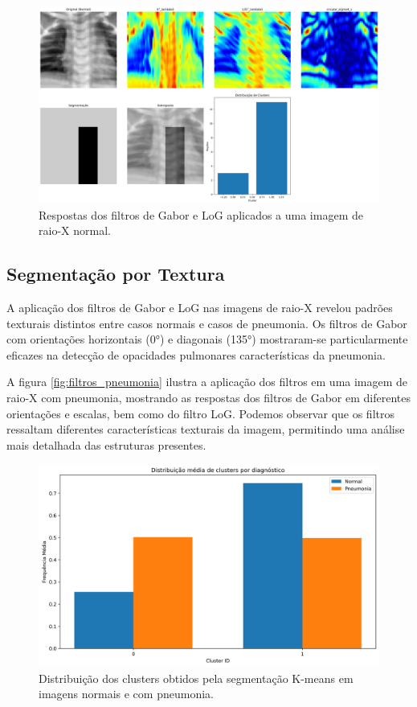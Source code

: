 \documentclass[sigconf,nonacm]{acmart}
\begin{document}
\begin{figure}[h]
  \centering
  \includegraphics[width=1\linewidth]{../images/global_1_norm.png}
  \caption{Respostas dos filtros de Gabor e LoG aplicados a uma imagem de raio-X normal.}
  \label{fig:filtros_normal}
\end{figure}

\subsection{Segmentação por Textura}
A aplicação dos filtros de Gabor e LoG nas imagens de raio-X revelou padrões texturais distintos entre casos normais e casos de pneumonia. Os filtros de Gabor com orientações horizontais (0°) e diagonais (135°) mostraram-se particularmente eficazes na detecção de opacidades pulmonares características da pneumonia.

A figura \ref{fig:filtros_pneumonia} ilustra a aplicação dos filtros em uma imagem de raio-X com pneumonia, mostrando as respostas dos filtros de Gabor em diferentes orientações e escalas, bem como do filtro LoG. Podemos observar que os filtros ressaltam diferentes características texturais da imagem, permitindo uma análise mais detalhada das estruturas presentes.

\begin{figure}[h]
  \centering
  \includegraphics[width=0.8\linewidth]{../images/global_avg_dist.png}
  \caption{Distribuição dos clusters obtidos pela segmentação K-means em imagens normais e com pneumonia.}
  \label{fig:clusters}
\end{figure}
  
\end{document}
